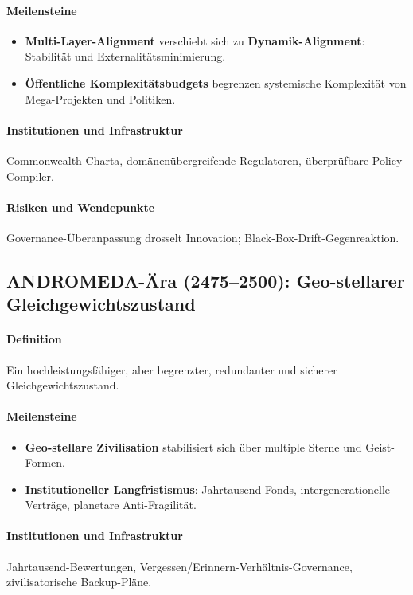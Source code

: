 \documentclass[11pt]{article}
\begin{document}
\paragraph{Meilensteine}
\begin{itemize}[noitemsep]
  \item \textbf{Multi-Layer-Alignment} verschiebt sich zu \textbf{Dynamik-Alignment}: Stabilität und Externalitätsminimierung.
  \item \textbf{Öffentliche Komplexitätsbudgets} begrenzen systemische Komplexität von Mega-Projekten und Politiken.
\end{itemize}

\paragraph{Institutionen und Infrastruktur} Commonwealth-Charta, domänenübergreifende Regulatoren, überprüfbare Policy-Compiler.

\paragraph{Risiken und Wendepunkte} Governance-Überanpassung drosselt Innovation; Black-Box-Drift-Gegenreaktion.

\subsection{ANDROMEDA-Ära (2475–2500): Geo-stellarer Gleichgewichtszustand}
\paragraph{Definition} Ein hochleistungsfähiger, aber begrenzter, redundanter und sicherer Gleichgewichtszustand.

\paragraph{Meilensteine}
\begin{itemize}[noitemsep]
  \item \textbf{Geo-stellare Zivilisation} stabilisiert sich über multiple Sterne und Geist-Formen.
  \item \textbf{Institutioneller Langfristismus}: Jahrtausend-Fonds, intergenerationelle Verträge, planetare Anti-Fragilität.
\end{itemize}

\paragraph{Institutionen und Infrastruktur} Jahrtausend-Bewertungen, Vergessen/Erinnern-Verhältnis-Governance, zivilisatorische Backup-Pläne.
\end{document}
